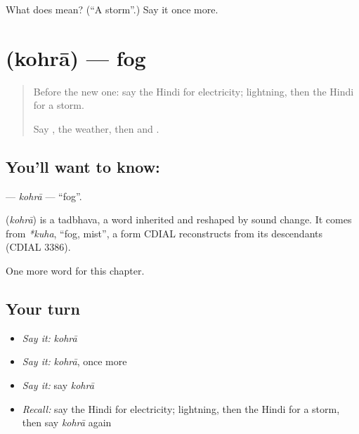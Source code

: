 \begin{tcolorbox}[breakable,colback=teal!4,colframe=teal!35!black,title={Before you move on}]
What does  mean? (\textquotedblleft{}A storm\textquotedblright{}.) Say it once more.
\end{tcolorbox}
\section[\texorpdfstring{\hi{कोहरा} (kohrā)}{कोहरा (kohrā)}]{ (kohrā) — fog}

\label{lesson:HI-C145-kohra}



\begin{quote}
Before the new one: say the Hindi for electricity; lightning, then the Hindi for a storm.

Say \textbf{}, the weather, then \textbf{ } and \textbf{ }.
\end{quote}

\subsection*{You'll want to know: }
\textbf{} — \emph{kohrā} — \textquotedblleft{}fog\textquotedblright{}.

\begin{cousinweb}
\textbf{} (\emph{kohrā}) is a tadbhava, a word inherited and reshaped by sound change. It comes from \emph{*kuha}, \textquotedblleft{}fog, mist\textquotedblright{}, a form CDIAL reconstructs from its descendants (CDIAL 3386).
\end{cousinweb}

\begin{grammarlens}[title={What you've built}]
One more word for this chapter.
\end{grammarlens}

\subsection*{Your turn}
\begin{itemize}
\raggedright
  \item \emph{Say it:} \emph{kohrā}
  \item \emph{Say it:} \emph{kohrā}, once more
  \item \emph{Say it:} say \emph{kohrā}
  \item \emph{Recall:} say the Hindi for electricity; lightning, then the Hindi for a storm, then say \emph{kohrā} again
\end{itemize}

